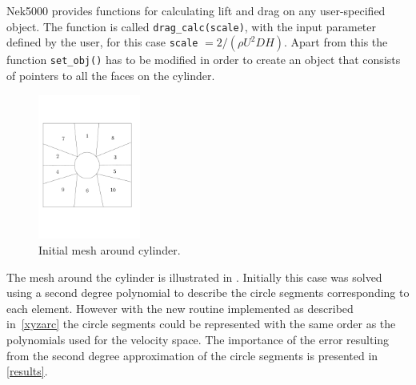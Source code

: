 Nek5000 provides functions for calculating lift and drag on any user-specified object.
The function is called \verb|drag_calc(scale)|, with the input parameter 
defined by the user, for this case \verb|scale| $=2/(\rho U^2DH)$.  
Apart from this the function \verb|set_obj()| has to be modified in order to create an object 
that consists of pointers to all the faces on the cylinder.
%
\begin{figure}[h]
    \centering
    \includegraphics[width = 0.3\textwidth]{Figures/cyl_elem.pdf}
    \caption{Initial mesh around cylinder.}
    \label{fig:cyl_elem}
\end{figure}
%
The mesh around the cylinder is illustrated in .
Initially this case was solved using a second degree polynomial to describe the circle segments
corresponding to each element. However with the new routine implemented as described 
in~\cref{xyzarc} the circle segments could be represented with the same order as 
the polynomials used for the velocity space. The importance of the error resulting 
from the second degree approximation of the circle segments is presented in \cref{results}.


